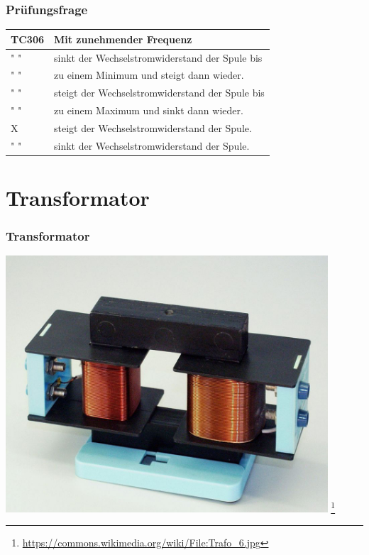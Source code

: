 \begin{frame}
    \frametitle{Prüfungsfrage}    
    \begin{center}
    \begin{tabular}{l||l}\hline
        TC306 & Mit zunehmender Frequenz\\\hline\hline
        " " & sinkt der Wechselstromwiderstand der Spule bis \\
        " " & zu einem Minimum und steigt dann wieder. \\ \hline
    	" " & steigt der Wechselstromwiderstand der Spule bis\\
        " " & zu einem Maximum und sinkt dann wieder. \\ \hline
        X &  steigt der Wechselstromwiderstand der Spule. \\ \hline
        " " & sinkt der Wechselstromwiderstand der Spule. \\ \hline
    \end{tabular}
 	\end{center}
\end{frame}

\section*{Transformator}
\begin{frame}
    \frametitle{Transformator}
        \begin{center}
        \includegraphics[width=0.9\textwidth]{e06/trafo-Real.jpg}
        \footnote{\tiny \url{https://commons.wikimedia.org/wiki/File:Trafo_6.jpg}}
         \end{center}
\end{frame}

